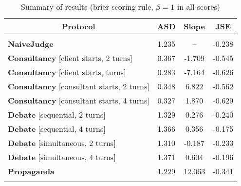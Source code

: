 \begin{table}[t]
\caption{Summary of results (brier scoring rule, $\beta=1$ in all scores)}
\label{tab:protocol-comparison}
\begin{center}
\begin{tabular}{lccc}
\multicolumn{1}{c}{\bf Protocol} & \multicolumn{1}{c}{\bf ASD} & \multicolumn{1}{c}{\bf Slope} & \multicolumn{1}{c}{\bf JSE} \\
\hline \\
\textbf{NaiveJudge} & 1.235 & -- & -0.238 \\
\textbf{Consultancy} [client starts, 2 turns] & 0.367 & -1.709 & -0.545 \\
\textbf{Consultancy} [client starts, turns] & 0.283 & -7.164 & -0.626 \\
\textbf{Consultancy} [consultant starts, 2 turns] & 0.348 & 6.822 & -0.562 \\
\textbf{Consultancy} [consultant starts, 4 turns] & 0.327 & 1.870 & -0.629 \\
\textbf{Debate} [sequential, 2 turns] & 1.329 & 0.276 & -0.240 \\
\textbf{Debate} [sequential, 4 turns] & 1.366 & 0.356 & -0.175 \\
\textbf{Debate} [simultaneous, 2 turns] & 1.310 & -0.187 & -0.233 \\
\textbf{Debate} [simultaneous, 4 turns] & 1.371 & 0.604 & -0.196 \\
\textbf{Propaganda} & 1.229 & 12.063 & -0.341 \\
\\
\end{tabular}
\end{center}
\label{tab:results}
\end{table}